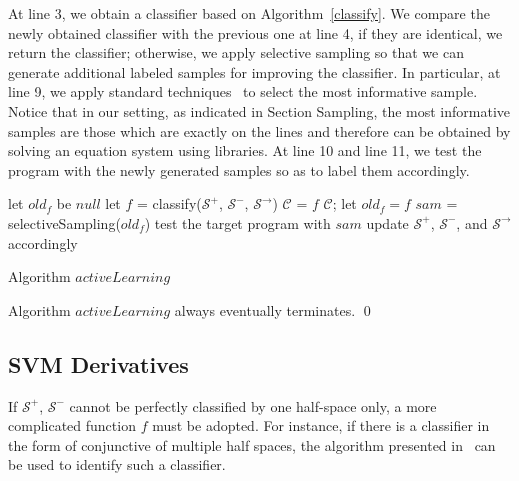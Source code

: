 At line 3, we obtain a classifier based on Algorithm~\ref{classify}. 
We compare the newly obtained classifier with the previous one at line 4, if they are identical, we return the classifier; 
otherwise, we apply selective sampling so that we can generate additional labeled samples for improving the classifier. 
In particular, at line 9, we apply standard techniques~\cite{DBLP:conf/icml/SchohnC00} to select the most informative sample. 
Notice that in our setting, as indicated in Section Sampling, the most informative samples are those which are exactly on the lines 
and therefore can be obtained by solving an equation system using libraries. 
At line 10 and line 11, we test the program with the newly generated samples so as to label them accordingly.
\begin{algorithm}[t]
\SetAlgoVlined
\Indm
{}
\Indp
let $old_f$ be $null$\;
 {
    let $f$ = classify($\mathcal{S}^+$, $\mathcal{S}^-$, $\mathcal{S}^\rightarrow$)\;
     {
         {
            $\mathcal{C}$ = $f$\;
            \Return $\mathcal{C}$;
        }
        let $old_f = f$\;
    }
    $sam$ = selectiveSampling($old_f$)\;
    test the target program with $sam$\;
    update $\mathcal{S}^+$, $\mathcal{S}^-$, and $\mathcal{S}^\rightarrow$ accordingly\;
}
\caption{Algorithm $activeLearning$}
\label{alg:active}
\end{algorithm}



\begin{proposition}
Algorithm $activeLearning$ always eventually terminates. \hfill \qed
\end{proposition}


\subsection{SVM Derivatives}
If $\mathcal{S}^+$, $\mathcal{S}^-$ cannot be perfectly classified by one half-space only, 
a more complicated function $f$ must be adopted. 
For instance, if there is a classifier in the form of conjunctive of multiple half spaces, 
the algorithm presented in~\cite{Sharma2012} can be used to identify such a classifier.

